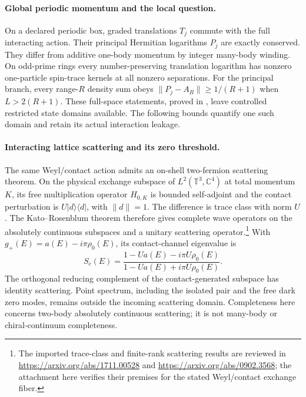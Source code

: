 \paragraph{Global periodic momentum and the local question.}
On a declared periodic box, graded translations $T_j$ commute with the
full interacting action. Their principal Hermitian logarithms $P_j$
are exactly conserved. They differ from additive one-body momentum
by integer many-body winding. On odd-prime rings every number-preserving
translation logarithm has nonzero one-particle spin-trace kernels at
all nonzero separations. For the principal branch, every range-$R$
density sum obeys $\|P_j-A_R\|\geq1/(R+1)$ when $L>2(R+1)$.
These full-space statements, proved in
, leave controlled restricted
state domains available. The following bounds quantify one such domain
and retain its actual interaction leakage.
{}
{}

\paragraph{Interacting lattice scattering and its zero threshold.}
The same Weyl/contact action admits an on-shell two-fermion scattering
theorem. On the physical exchange subspace of
$L^2(\mathbb T^3,\mathbb C^4)$ at total momentum $K$, its free multiplication
operator $H_{0,K}$ is bounded self-adjoint and the contact perturbation is
$U|d\rangle\langle d|$, with $\|d\|=1$. The difference is trace class
with norm $U$. The Kato--Rosenblum theorem therefore gives complete wave
operators on the absolutely continuous subspaces and a unitary scattering
operator.\footnote{The imported trace-class and finite-rank scattering
results are reviewed in \url{https://arxiv.org/abs/1711.00528} and
\url{https://arxiv.org/abs/0902.3568}; the attachment here verifies their
premises for the stated Weyl/contact exchange fiber.}
With $g_+(E)=a(E)-i\pi\rho_0(E)$, its contact-channel eigenvalue is
\[
 S_c(E)=\frac{1-Ua(E)-i\pi U\rho_0(E)}
              {1-Ua(E)+i\pi U\rho_0(E)}.
\]
The orthogonal reducing complement of the contact-generated subspace has
identity scattering. Point spectrum, including the isolated pair and
the free dark zero modes, remains outside the incoming scattering domain.
Completeness here concerns two-body absolutely continuous scattering;
it is not many-body or chiral-continuum completeness.

